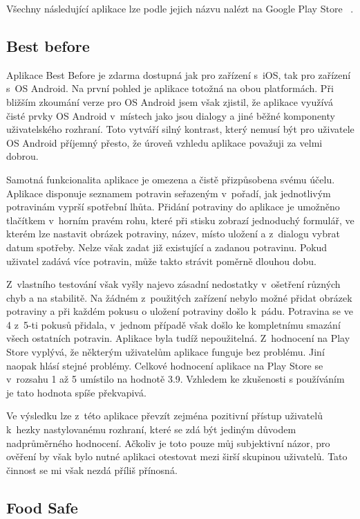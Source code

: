 \documentclass[thesis=B,czech]{FITthesis}[2013/10/20]
\begin{document}
Všechny následující aplikace lze podle jejich názvu nalézt na Google Play Store ~\cite{play_store}.

\subsection{Best before}

Aplikace Best Before je zdarma dostupná jak pro zařízení s~iOS, tak pro zařízení s~OS Android. Na první pohled je aplikace totožná na obou platformách. Při bližším zkoumání verze pro OS Android jsem však zjistil, že aplikace využívá čisté prvky OS Android v~místech jako jsou dialogy a jiné běžné komponenty uživatelského rozhraní. Toto vytváří silný kontrast, který nemusí být pro uživatele OS Android příjemný přesto, že úroveň vzhledu aplikace považuji za velmi dobrou.

Samotná funkcionalita aplikace je omezena a čistě přizpůsobena svému účelu. Aplikace disponuje seznamem potravin seřazeným v~pořadí, jak jednotlivým potravinám vyprší spotřební lhůta. Přidání potraviny do aplikace je umožněno tlačítkem v~horním pravém rohu, které při stisku zobrazí jednoduchý formulář, ve kterém lze nastavit obrázek potraviny, název, místo uložení a z~dialogu vybrat datum spotřeby. Nelze však zadat již existující a zadanou potravinu. Pokud uživatel zadává více potravin, může takto strávit poměrně dlouhou dobu.

Z~vlastního testování však vyšly najevo zásadní nedostatky v~ošetření různých chyb a na stabilitě. Na žádném z~použitých zařízení nebylo možné přidat obrázek potraviny a při každém pokusu o uložení potraviny došlo k~pádu. Potravina se ve 4 z~5-ti pokusů přidala, v~jednom případě však došlo ke kompletnímu smazání všech ostatních potravin. Aplikace byla tudíž nepoužitelná. Z~hodnocení na Play Store vyplývá, že některým uživatelům aplikace funguje bez problému. Jiní naopak hlásí stejné problémy. Celkové hodnocení aplikace na Play Store se v~rozsahu 1 až 5 umístilo na hodnotě 3.9. Vzhledem ke zkušenosti s používáním je tato hodnota spíše překvapivá.

Ve výsledku lze z~této aplikace převzít zejména pozitivní přístup uživatelů k~hezky nastylovanému rozhraní, které se zdá být jediným důvodem nadprůměrného hodnocení. Ačkoliv je toto pouze můj subjektivní názor, pro ověření by však bylo nutné aplikaci otestovat mezi širší skupinou uživatelů. Tato činnost se mi však nezdá příliš přínosná.

\subsection{Food Safe}
\end{document}
